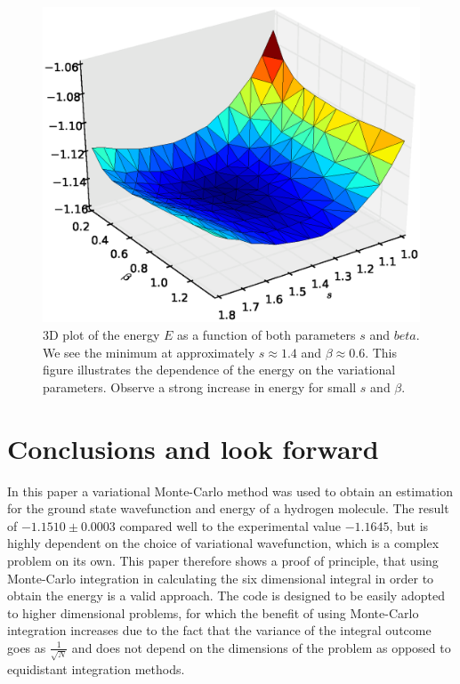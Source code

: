 \documentclass[twoside]{article}
\begin{document}
\begin{figure}
\centering
\includegraphics[width=\linewidth]{figs/3dPlot.eps}
\caption{3D plot of the energy $E$ as a function of both parameters $s$ and $beta$. We see the minimum at approximately $s\approx1.4$ and $\beta \approx 0.6$. This figure illustrates the dependence of the energy on the variational parameters. Observe a strong increase in energy for small $s$ and $\beta$. }
\label{fig:3dPlot}
\end{figure}

	
\section{Conclusions and look forward}
In this paper a variational Monte-Carlo method was used to obtain an estimation for the ground state wavefunction and energy of a hydrogen molecule. The result of $-1.1510 \pm 0.0003$ compared well to the experimental value $-1.1645$, but is highly dependent on the choice of variational wavefunction, which is a complex problem on its own. This paper therefore shows a proof of principle, that using Monte-Carlo integration in calculating the six dimensional integral in order to obtain the energy is a valid approach. The code is designed to be easily adopted to higher dimensional problems, for which the benefit of using Monte-Carlo integration increases due to the fact that the variance of the integral outcome goes as $\frac{1}{\sqrt{N}}$ and does not depend on the dimensions of the problem as opposed to equidistant integration methods.
\end{document}
